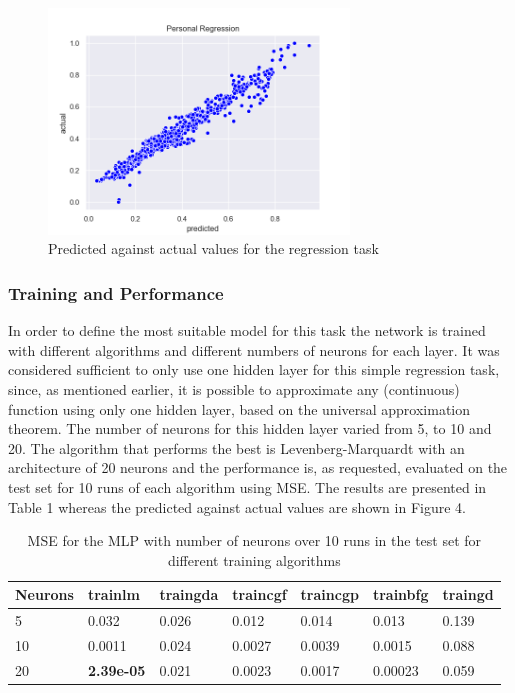 \documentclass[11pt,conference,compsoc]{IEEEtran}
\begin{document}
\begin{figure}
    \centering
    \includegraphics[width=8cm]{images/regression.png}
    \caption{Predicted against actual values for the regression task}
    \label{fig:4}
\end{figure}


\subsubsection{Training and Performance}
In order to define the most suitable model for this task the network is trained with different algorithms and different numbers of neurons for each layer. It was considered sufficient to only use one hidden layer for this simple regression task, since, as mentioned earlier, it is possible to approximate any (continuous) function using only one hidden layer, based on the universal approximation theorem. The number of neurons for this hidden layer varied from 5, to 10 and 20. The algorithm that performs the best is Levenberg-Marquardt with an architecture of 20 neurons and the performance is, as requested, evaluated on the test set for 10 runs of each algorithm using MSE. The results are presented in Table 1 whereas the predicted against actual values are shown in Figure 4.  

\begin{table}
\centering
\begin{tabular}[t]{l l l l l l l}
\toprule 
 Neurons & trainlm & traingda & traincgf & traincgp & trainbfg & traingd \\
\midrule
 5 & 0.032 & 0.026 & 0.012 & 0.014 & 0.013 & 0.139\\
 10 & 0.0011 & 0.024 & 0.0027 & 0.0039 & 0.0015 & 0.088 \\
 20 & \textbf{2.39e-05}  & 0.021 & 0.0023 & 0.0017 & 0.00023 & 0.059 \\
\bottomrule
\end{tabular}
\label{tbl:1}
\caption{MSE for the MLP with number of neurons over 10 runs in the test set for different training algorithms}
\label{1}
\end{table}
\end{document}

